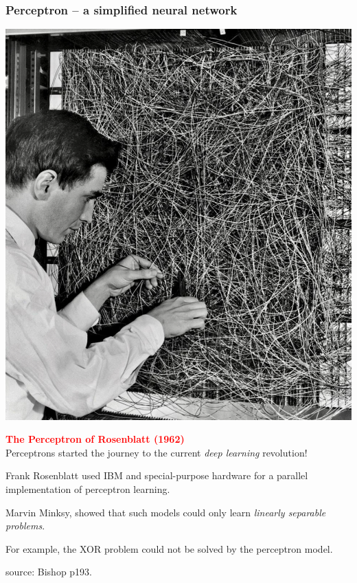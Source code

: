 \documentclass[10pt]{beamer}
\begin{document}
\begin{frame}[fragile]
\frametitle{Perceptron -- a simplified neural network}


\centerline{\includegraphics[scale=0.15]{figures/Rosenblatt.png}}
\textbf{\textcolor{red}{The Perceptron of Rosenblatt (1962)}}\\
Perceptrons started the journey to the current \emph{deep learning} revolution!

Frank Rosenblatt used IBM and special-purpose hardware for a parallel implementation of perceptron learning. 

Marvin Minksy, showed that such models could only learn \emph{linearly separable problems}. 

For example, the XOR problem could not be solved by the perceptron model.

{\fontsize{6}{6} \selectfont source: Bishop p193.}

\end{frame}
\end{document}
